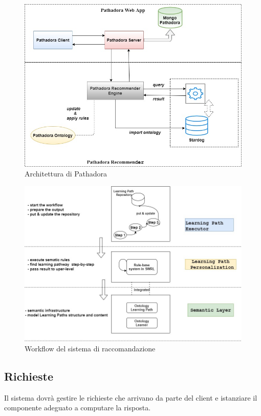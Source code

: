 \begin{figure}[H]
\centering
\includegraphics[scale=0.4]{res/pathadora-arch.jpg}
\caption{Architettura di Pathadora}
\label{fig:pathadora-arch}
\end{figure}

\begin{figure}[H]
\centering
\includegraphics[scale=0.4]{res/diag-layers.jpg}
\caption{Workflow del sistema di raccomandazione}
\label{fig:diag-layers}
\end{figure}

\subsection{Richieste}
Il sistema dovrà gestire le richieste che arrivano da parte del client e istanziare il componente adeguato a computare la risposta.

